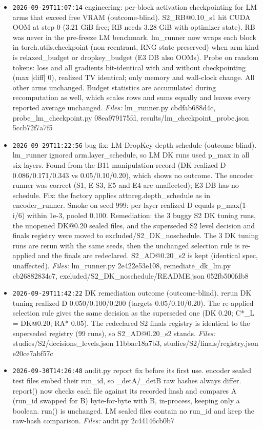 \documentclass[11pt]{article}
\begin{document}
\begin{itemize}
\item \texttt{2026-09-29T11:07:14} engineering: per-block activation checkpointing for LM arms that exceed free VRAM (outcome-blind). S2\_RB@0.10\_s1 hit CUDA OOM at step 0 (3.21 GiB free; RB needs 3.28 GiB with optimizer state). RB was never in the pre-freeze LM benchmark. lm\_runner now wraps each block in torch.utils.checkpoint (non-reentrant, RNG state preserved) when arm kind is relaxed\_budget or dropkey\_budget (E3 DB also OOMs). Probe on random tokens: loss and all gradients bit-identical with and without checkpointing (max |diff| 0), realized TV identical; only memory and wall-clock change. All other arms unchanged. Budget statistics are accumulated during recomputation as well, which scales rows and sums equally and leaves every reported average unchanged. \emph{Files:} lm\_runner.py cbdfab688d4c, probe\_lm\_checkpoint.py 08ea979175fd, results/lm\_checkpoint\_probe.json 5ccb72f7a7f5
\item \texttt{2026-09-29T11:22:56} bug fix: LM DropKey depth schedule (outcome-blind). lm\_runner ignored arm.layer\_schedule, so LM DK runs used p\_max in all six layers. Found from the B11 manipulation record (DK realized D 0.086/0.171/0.343 vs 0.05/0.10/0.20), which shows no outcome. The encoder runner was correct (S1, E-S3, E5 and E4 are unaffected); E3 DB has no schedule. Fix: the factory applies attnreg.depth\_schedule as in encoder\_runner. Smoke on seed 999: per-layer realized D equals p\_max(1-i/6) within 1e-3, pooled 0.100. Remediation: the 3 buggy S2 DK tuning runs, the unopened DK@0.20 sealed files, and the superseded S2 level decision and finals registry were moved to excluded/S2\_DK\_noschedule. The 3 DK tuning runs are rerun with the same seeds, then the unchanged selection rule is re-applied and the finals are redeclared. S2\_AD@0.20\_s2 is kept (identical spec, unaffected). \emph{Files:} lm\_runner.py 2e422e53e108, remediate\_dk\_lm.py cb26882834c7, excluded/S2\_DK\_noschedule/README.json 052fb500fdb8
\item \texttt{2026-09-29T11:42:22} DK remediation outcome (outcome-blind). rerun DK tuning realized D 0.050/0.100/0.200 (targets 0.05/0.10/0.20). The re-applied selection rule gives the same decision as the superseded one (DK 0.20; C*\_L = DK@0.20; RA* 0.05). The redeclared S2 finals registry is identical to the superseded registry (99 runs), so S2\_AD@0.20\_s2 stands. \emph{Files:} studies/S2/decisions\_levels.json 11bbae18a7b3, studies/S2/finals/registry.json e20ce7abf57c
\item \texttt{2026-09-30T14:26:48} audit.py report fix before its first use. encoder sealed test files embed their run\_id, so \_detA/\_detB raw hashes always differ. report() now checks each file against its recorded hash and compares A (run\_id swapped for B) byte-for-byte with B, in-process, keeping only a boolean. run() is unchanged. LM sealed files contain no run\_id and keep the raw-hash comparison. \emph{Files:} audit.py 2c44146cb0b7

\end{itemize}
\end{document}
